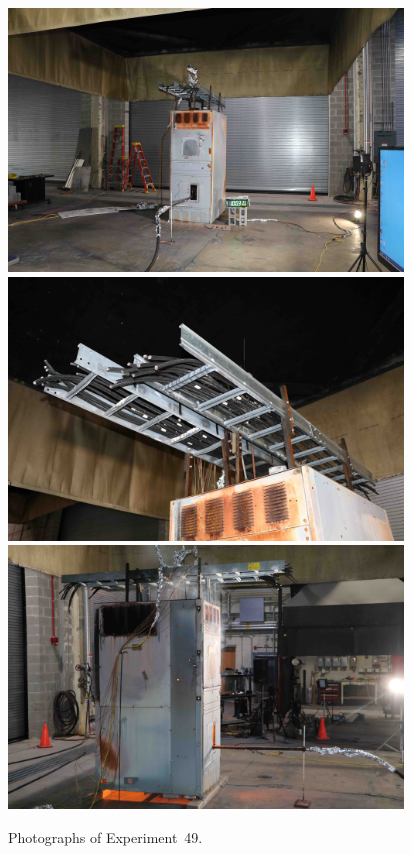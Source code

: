 \begin{figure}[p]
\centering
\includegraphics[height=2.75in]{../FIGURES/Test_49_setup} \\
\includegraphics[height=2.75in]{../FIGURES/Test_49_cables} \\
\includegraphics[height=2.75in]{../FIGURES/Test_49_fire}
\caption[Photographs of Experiment~49]{Photographs of Experiment~49.}
\label{fig:Test_49_photos}
\end{figure}


\clearpage

